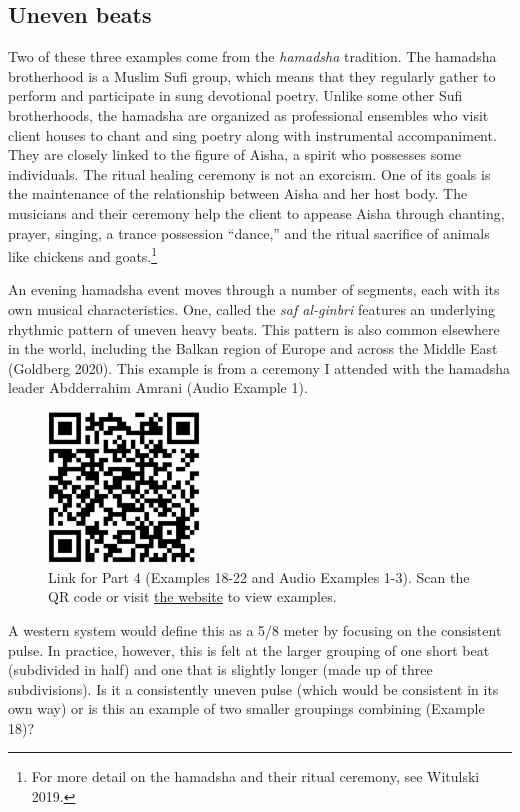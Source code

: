 \documentclass[twoside]{article}
\providecommand{\wmturlcaption}{
  Scan the QR code or visit \href{https://worldmusictextbook.org/witulski-2021}{the website} to view examples.
}
\begin{document}
\hypertarget{uneven-beats}{%
\subsection*{Uneven beats}\label{uneven-beats}}

Two of these three examples come from the \emph{hamadsha} tradition. The
hamadsha brotherhood is a Muslim Sufi group, which means that they
regularly gather to perform and participate in sung devotional poetry.
Unlike some other Sufi brotherhoods, the hamadsha are organized as
professional ensembles who visit client houses to chant and sing poetry
along with instrumental accompaniment. They are closely linked to the
figure of Aisha, a spirit who possesses some individuals. The ritual
healing ceremony is not an exorcism. One of its goals is the maintenance
of the relationship between Aisha and her host body. The musicians and
their ceremony help the client to appease Aisha through chanting,
prayer, singing, a trance possession ``dance,'' and the ritual sacrifice
of animals like chickens and goats.\footnote{For more detail on the
  hamadsha and their ritual ceremony, see Witulski 2019.}

An evening hamadsha event moves through a number of segments, each with
its own musical characteristics. One, called the \emph{saf al-ginbri}
features an underlying rhythmic pattern of uneven heavy beats. This
pattern is also common elsewhere in the world, including the Balkan
region of Europe and across the Middle East (Goldberg 2020). This
example is from a ceremony I attended with the hamadsha leader
Abdderrahim Amrani (Audio Example 1).

\begin{figure}
  \centering
  \includegraphics[height=4cm]{witulski-rhythm-part-4.png}
  \caption*{Link for Part 4 (Examples 18-22 and Audio Examples 1-3). \wmturlcaption}
\end{figure}

A western system would define this as a 5/8 meter by focusing on the
consistent pulse. In practice, however, this is felt at the larger
grouping of one short beat (subdivided in half) and one that is slightly
longer (made up of three subdivisions). Is it a consistently uneven
pulse (which would be consistent in its own way) or is this an example
of two smaller groupings combining (Example 18)?
\end{document}
